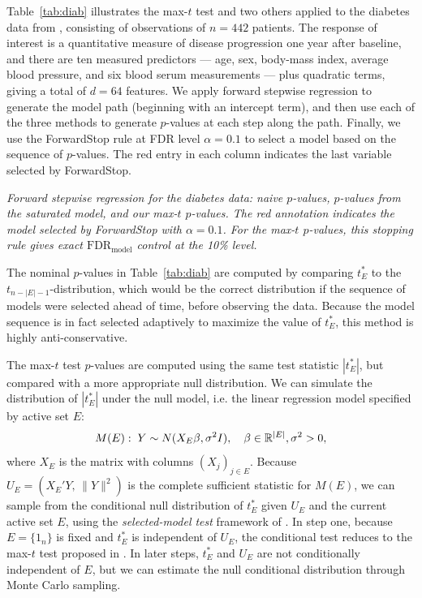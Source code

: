 \documentclass{article}
\begin{document}
Table~\ref{tab:diab} illustrates the max-$t$ test and two others applied to the diabetes data from \cite{LARS}, consisting of observations of $n=442$ patients. The response of interest is a quantitative measure of disease progression one year after baseline, and there are ten measured predictors --- age, sex, body-mass index, average blood pressure, and six blood serum measurements --- plus quadratic terms, giving a total of $d=64$ features. We apply forward stepwise regression to generate the model path (beginning with an intercept term), and then use each of the three methods to generate $p$-values at each step along the path. Finally, we use the ForwardStop rule \citep{gsell2013sequential} at FDR level $\alpha=0.1$ to select a model based on the sequence of $p$-values. The red entry in each column indicates the last variable selected by ForwardStop.

\begin{table}[ht]
\centering

\caption[tab:diab]{\em Forward stepwise regression for the diabetes data: naive $p$-values, $p$-values from the saturated model, and our max-$t$ $p$-values. The red annotation indicates the model selected by ForwardStop with $\alpha=0.1$. For the max-$t$ $p$-values, this stopping rule gives exact $\text{FDR}_{\text{model}}$ control at the 10\% level.}
\label{tab:diab}
\end{table}

The nominal $p$-values in Table~\ref{tab:diab} are computed by comparing $t_E^*$ to the $t_{n-|E|-1}$-distribution, which would be the correct distribution if the sequence of models were selected ahead of time, before observing the data. Because the model sequence is in fact selected adaptively to maximize the value of $t_E^*$, this method is highly anti-conservative.

The max-$t$ test $p$-values are computed using the same test statistic $|t_E^*|$, but compared with a more appropriate null distribution. We can simulate the distribution of $|t_E^*|$ under the null model, i.e. the linear regression model specified by active set $E$:
\begin{equation}
  M(E):\; Y \sim N(X_E\beta, \sigma^2 I), \quad \beta\in \mathbb{R}^{|E|}, \sigma^2>0,
\end{equation}
where $X_E$ is the matrix with columns $(X_j)_{j\in E}$. Because $U_E=\left(X_E'Y,\, \|Y\|^2\right)$ is the complete sufficient statistic for $M(E)$, we can sample from the conditional null distribution of $t_E^*$ given $U_E$ and the current active set $E$, using the {\em selected-model test} framework of \citet{fithian2014optimal}. In step one, because $E=\{1_n\}$ is fixed and $t_E^*$ is independent of $U_E$, the conditional test reduces to the max-$t$ test proposed in \citet{buja2014}. In later steps, $t_E^*$ and $U_E$ are not conditionally independent of $E$, but we can estimate the null conditional distribution through Monte Carlo sampling.
\end{document}
